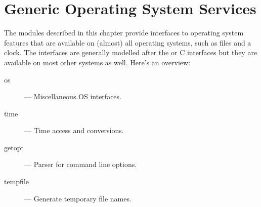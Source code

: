 \chapter{Generic Operating System Services}

The modules described in this chapter provide interfaces to operating
system features that are available on (almost) all operating systems,
such as files and a clock.  The interfaces are generally modelled
after the \UNIX{} or C interfaces but they are available on most other
systems as well.  Here's an overview:

\begin{description}

\item[os]
--- Miscellaneous OS interfaces.

\item[time]
--- Time access and conversions.

\item[getopt]
--- Parser for command line options.

\item[tempfile]
--- Generate temporary file names.

\end{description}
